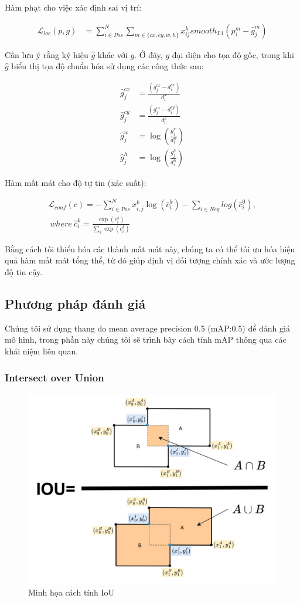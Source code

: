 \documentclass[a4paper]{article}
\begin{document}
Hàm phạt cho việc xác định sai vị trí:

\begin{align}
	\mathcal{L}_{loc}(p, g) &= \sum_{i \in Pos}^{N} \sum_{m \in \lbrace cx, cy, w, h\rbrace} x_{ij}^{k} smooth_{L1}(p_i^m - \hat{g}_j^m)
\end{align} 

Cần lưu ý rằng ký hiệu $\hat{g}$ khác với $g$. Ở đây, $g$ đại diện cho tọa độ gốc, trong khi $\hat{g}$ biểu thị tọa độ chuẩn hóa sử dụng các công thức sau:

\begin{align}
	\hat{g}_j^{cx} &= \frac{(g_j^{cx} - d_i^{cx})}{d_i^w} \\ 
	\hat{g}_j^{cy} &= \frac{(g_j^{cx} - d_i^{cy})}{d_i^h} \\
	\hat{g}_j^w    &= \log(\frac{g_j^w}{d_i^w}) \\
	\hat{g}_j^h    &= \log(\frac{g_j^h}{d_i^h})
\end{align}

Hàm mất mát cho độ tự tin (xác suất):

\begin{align}
	\mathcal{L}_{conf}(c) = - \sum_{i \in Pos}^N x_{i, j}^k \log(\hat{c}_i^k) - \sum_{i \in Neg} log(\hat{c}_i^0), \\
	 ~ where ~ \hat{c}_i^k = \frac{\exp(c_i^k)}{\sum_{k} \exp(c_i^k)}
\end{align}


Bằng cách tối thiểu hóa các thành mất mát này, chúng ta có thể tối ưu hóa hiệu quả hàm mất mát tổng thể, từ đó giúp định vị đối tượng chính xác và ước lượng độ tin cậy. \\

\subsection{\textbf{Phương pháp đánh giá}}

Chúng tôi sử dụng thang đo mean average precision 0.5 (mAP:0.5) để đánh giá mô hình, trong phần này chúng tôi sẽ trình bày cách tính mAP thông qua các khái niệm liên quan.

\subsubsection{\textbf{Intersect over Union}}

\begin{figure}[h]
	\centering
	\includegraphics[width=0.5\linewidth]{fig/IOU3-1024x784}
	\caption{Minh họa cách tính IoU}
	\label{fig:iou3-1024x784}
\end{figure}
\end{document}
